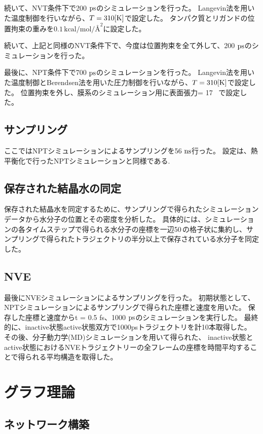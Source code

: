 続いて、NVT条件下で200 $\rm{ps}$のシミュレーションを行った。
Langevin法を用いた温度制御を行いながら、$T = 310 \rm{[K]}$で設定した。
タンパク質とリガンドの位置拘束の重みを$0.1 \, \text{kcal/mol/\AA}^2$に設定した。

続いて、上記と同様のNVT条件下で、今度は位置拘束を全て外して、200 $\rm{ps}$のシミュレーションを行った。

最後に、NP\gamma T条件下で700 $\rm{ps}$のシミュレーションを行った。
Langevin法を用いた温度制御とBerendsen法を用いた圧力制御を行いながら、$T = 310 \rm{[K]}$で設定した。
位置拘束を外し、膜系のシミュレーション用に表面張力\gamma = 17 \, で設定した。

\subsection{サンプリング}
ここではNP\gamma Tシミュレーションによるサンプリングを56 $\rm{ns}$行った。
設定は、熱平衡化で行ったNP\gamma Tシミュレーションと同様である.

\subsection{保存された結晶水の同定}
保存された結晶水を同定するために、サンプリングで得られたシミュレーションデータから水分子の位置とその密度を分析した。
具体的には、シミュレーションの各タイムステップで得られる水分子の座標を一辺50\,\text{\AA}の格子状に集約し、サンプリングで得られたトラジェクトリの半分以上で保存されている水分子を同定した。

\subsection{NVE}
最後にNVEシミュレーションによるサンプリングを行った。
初期状態として、NP\gamma Tシミュレーションによるサンプリングで得られた座標と速度を用いた。
保存した座標と速度から\Delta t = 0.5 fs、1000 $\rm{ps}$のシミュレーションを実行した。
最終的に、inactive状態active状態双方で1000psトラジェクトリを計10本取得した。
その後、分子動力学(MD)シミュレーションを用いて得られた、
inactive状態とactive状態におけるNVEトラジェクトリーの全フレームの座標を時間平均することで得られる平均構造を取得した。

\section{グラフ理論}
\label{sec:graph theory}

\subsection{ネットワーク構築}

